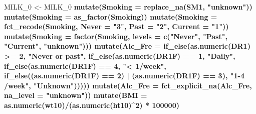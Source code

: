 \documentclass[
]{article}
\newenvironment{Shaded}{\begin{snugshade}}{\end{snugshade}}
\newcommand{\CommentTok}[1]{\textcolor[rgb]{0.56,0.35,0.01}{\textit{#1}}}
\newcommand{\DataTypeTok}[1]{\textcolor[rgb]{0.13,0.29,0.53}{#1}}
\newcommand{\DecValTok}[1]{\textcolor[rgb]{0.00,0.00,0.81}{#1}}
\newcommand{\KeywordTok}[1]{\textcolor[rgb]{0.13,0.29,0.53}{\textbf{#1}}}
\newcommand{\NormalTok}[1]{#1}
\newcommand{\OperatorTok}[1]{\textcolor[rgb]{0.81,0.36,0.00}{\textbf{#1}}}
\newcommand{\StringTok}[1]{\textcolor[rgb]{0.31,0.60,0.02}{#1}}
\begin{document}
\begin{Shaded}
\begin{Highlighting}[]
\NormalTok{MILK_}\DecValTok{0}\NormalTok{ <-}\StringTok{  }\NormalTok{MILK_}\DecValTok{0} \OperatorTok{%
\StringTok{  }\KeywordTok{mutate}\NormalTok{(}\DataTypeTok{Smoking =} \KeywordTok{replace_na}\NormalTok{(SM1, }\StringTok{"unknown"}\NormalTok{)) }\OperatorTok{%
\StringTok{  }\KeywordTok{mutate}\NormalTok{(}\DataTypeTok{Smoking =} \KeywordTok{as_factor}\NormalTok{(Smoking)) }\OperatorTok{%
\StringTok{  }\KeywordTok{mutate}\NormalTok{(}\DataTypeTok{Smoking =} \KeywordTok{fct_recode}\NormalTok{(Smoking, }\DataTypeTok{Never =} \StringTok{"3"}\NormalTok{, }\DataTypeTok{Past =} \StringTok{"2"}\NormalTok{, }\DataTypeTok{Current =} \StringTok{"1"}\NormalTok{)) }\OperatorTok{%
\StringTok{  }\KeywordTok{mutate}\NormalTok{(}\DataTypeTok{Smoking =} \KeywordTok{factor}\NormalTok{(Smoking, }\DataTypeTok{levels =} \KeywordTok{c}\NormalTok{(}\StringTok{"Never"}\NormalTok{, }\StringTok{"Past"}\NormalTok{, }\StringTok{"Current"}\NormalTok{, }\StringTok{"unknown"}\NormalTok{))) }\OperatorTok{%
\StringTok{  }\KeywordTok{mutate}\NormalTok{(}\DataTypeTok{Alc_Fre =} \KeywordTok{if_else}\NormalTok{(}\KeywordTok{as.numeric}\NormalTok{(DR1) }\OperatorTok{>=}\StringTok{ }\DecValTok{2}\NormalTok{, }\StringTok{"Never or past"}\NormalTok{, }
                           \KeywordTok{if_else}\NormalTok{(}\KeywordTok{as.numeric}\NormalTok{(DR1F) }\OperatorTok{==}\StringTok{ }\DecValTok{1}\NormalTok{, }\StringTok{"Daily"}\NormalTok{, }
                                   \KeywordTok{if_else}\NormalTok{(}\KeywordTok{as.numeric}\NormalTok{(DR1F) }\OperatorTok{==}\StringTok{ }\DecValTok{4}\NormalTok{, }\StringTok{"< 1/week"}\NormalTok{, }
                                           \KeywordTok{if_else}\NormalTok{((}\KeywordTok{as.numeric}\NormalTok{(DR1F) }\OperatorTok{==}\StringTok{ }\DecValTok{2}\NormalTok{) }\OperatorTok{|}\StringTok{ }\NormalTok{(}\KeywordTok{as.numeric}\NormalTok{(DR1F) }\OperatorTok{==}\StringTok{ }\DecValTok{3}\NormalTok{), }
                                                   \StringTok{"1-4 /week"}\NormalTok{, }\StringTok{"Unknown"}\NormalTok{))))) }\OperatorTok{%
\StringTok{  }\KeywordTok{mutate}\NormalTok{(}\DataTypeTok{Alc_Fre =} \KeywordTok{fct_explicit_na}\NormalTok{(Alc_Fre, }\DataTypeTok{na_level =} \StringTok{"unknown"}\NormalTok{)) }\OperatorTok{%
\StringTok{  }\KeywordTok{mutate}\NormalTok{(}\DataTypeTok{BMI =} \KeywordTok{as.numeric}\NormalTok{(wt10)}\OperatorTok{/}\NormalTok{(}\KeywordTok{as.numeric}\NormalTok{(ht10)}\OperatorTok{^}\DecValTok{2}\NormalTok{) }\OperatorTok{*}\StringTok{ }\DecValTok{100000}\NormalTok{) }\OperatorTok{%
}}}}}}}}
\end{Highlighting}
\end{Shaded}
\end{document}
